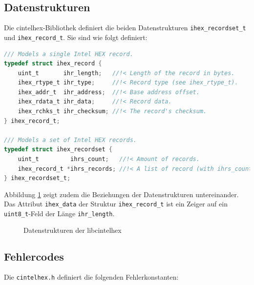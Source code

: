 \documentclass[11pt]{scrartcl}
\begin{document}
\subsection{Datenstrukturen}
\label{ihex_structs}

Die cintelhex-Bibliothek definiert die beiden Datenstrukturen \texttt{ihex\_recordset\_t} und \texttt{ihex\_record\_t}. Sie sind wie folgt definiert:

\begin{lstlisting}[language=C,morekeywords={uint\_t, ihex\_rtype\_t, ihex\_addr\_t, ihex\_rdata\_t, ihex\_rchks\_t, ihex\_record\_t, ihex\_recordset\_t}, caption=Definition der \texttt{ihex\_record\_t}- und \texttt{ihex\_recordset\_t}-Strukturen]
/// Models a single Intel HEX record.
typedef struct ihex_record {
	uint_t       ihr_length;   //!< Length of the record in bytes.
	ihex_rtype_t ihr_type;     //!< Record type (see ihex_rtype_t).
	ihex_addr_t  ihr_address;  //!< Base address offset.
	ihex_rdata_t ihr_data;     //!< Record data.
	ihex_rchks_t ihr_checksum; //!< The record's checksum.
} ihex_record_t;

/// Models a set of Intel HEX records.
typedef struct ihex_recordset {
	uint_t         ihrs_count;   //!< Amount of records.
	ihex_record_t *ihrs_records; //!< A list of record (with ihrs_count elements).
} ihex_recordset_t;
\end{lstlisting}

Abbildung \ref{lcih_datastructs} zeigt zudem die Beziehungen der Datenstrukturen untereinander. Das Attribut \texttt{ihex\_data} der Struktur \texttt{ihex\_record\_t} ist ein Zeiger auf ein \texttt{uint8\_t}-Feld der Länge \texttt{ihr\_length}.

\begin{figure}[!htb]
	\begin{center}
		
	\end{center}
	\caption{Datenstrukturen der libcintelhex}
	\label{lcih_datastructs}
\end{figure}

\subsection{Fehlercodes}

Die \texttt{cintelhex.h} definiert die folgenden Fehlerkonstanten:
\end{document}
